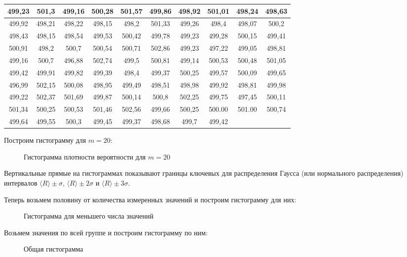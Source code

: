 \documentclass[12pt]{article}
\begin{document}
\begin{table}[H]
\begin{tabular}{|c|c|c|c|c|c|c|c|c|c|}
        499,23 & 501,3  & 499,16 & 500,28 & 501,57 & 499,86 & 498,92 & 501,01 & 498,24 & 498,63 \\ \hline
        499,92 & 498,21 & 498,22 & 498,15 & 498,2  & 501,33 & 499,26 & 498,4  & 498,07 & 500,2  \\ \hline
        498,43 & 498,15 & 498,54 & 499,53 & 500,42 & 499,78 & 499,23 & 499,28 & 500,15 & 499,41 \\ \hline
        500,91 & 498,2  & 500,7  & 500,54 & 500,71 & 502,86 & 499,23 & 497,22 & 499,05 & 498,81 \\ \hline
        499,16 & 500,7  & 496,88 & 502,74 & 499,5  & 500,81 & 499,14 & 500,53 & 500,48 & 501,05 \\ \hline
        499,42 & 499,91 & 499,82 & 499,39 & 498,4  & 499,37 & 500,25 & 499,57 & 500,09 & 499,65 \\ \hline
        496,99 & 502,15 & 500,08 & 498,95 & 499,49 & 498,51 & 498,98 & 499,92 & 498,81 & 499,98 \\ \hline
        499,22 & 502,37 & 501,69 & 499,87 & 500,14 & 500,8  & 502,25 & 499,75 & 497,45 & 500,11 \\ \hline
        501,34 & 500,25 & 500,53 & 501,46 & 502,56 & 499,66 & 500,25 & 500.00 & 501.00 & 500,74 \\ \hline
        499,64 & 499,55 & 500,3  & 499,45 & 499,37 & 498,68 & 499,7  & 499,42 &        &        \\ \hline
        \end{tabular}
    \end{table}

    Построим гистограмму для $m = 20$:
    \begin{figure}[H]
        \centering
        
        \caption{Гистограмма плотности вероятности для $m = 20$}
    \end{figure}

    \par Вертикальные прямые на гистограммах показывают границы ключевых
    для распределения Гаусса (или нормального распределения) интервалов
    $\langle R \rangle \pm \sigma$, $\langle R \rangle \pm 2\sigma$ и
    $\langle R \rangle \pm 3\sigma$.
    \par Теперь возьмем половину от количества измеренных значений и построим
    гистограмму для них:
    \begin{figure}[H]
        \centering
        
        \caption{Гистограмма для меньшего числа значений}
    \end{figure}
    Возьмем значения по всей группе и построим гистограмму по
    ним:
    \begin{figure}[H]
        \centering
        \caption{Общая гистограмма}
        
    \end{figure}
\end{document}
